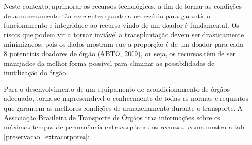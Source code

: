 Neste contexto, aprimorar os recursos tecnológicos, a fim de tornar as condições de armazenamento tão excelentes quanto o necessário para garantir o funcionamento e integridade ao recurso vindo de um doador é fundamental. Os riscos que podem vir a tornar inviável a transplantação devem ser drasticamente minimizados, pois os dados mostram que a proporção é de um doador para cada 8 potenciais doadores de órgão (ABTO, 2009), ou seja, os recursos têm de ser manejados da melhor forma possível para eliminar as possibilidades de inutilização do órgão.
	
Para o desenvolvimento de um equipamento de acondicionamento de órgãos adequado, torna-se imprescindível o conhecimento de todas as normas e requisitos que garantem as melhores condições de armazenamento durante o transporte. A Associação Brasileira de Transporte de Órgãos traz informações sobre os máximos tempos de permanência extracorpórea dos recursos, como mostra a tab. \ref{preservacao_extracorporea}:

